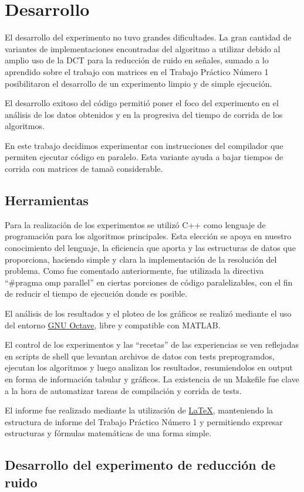 
\section{Desarrollo}

El desarrollo del experimento no tuvo grandes dificultades. La gran cantidad de
variantes de implementaciones encontradas del algoritmo a utilizar debido al
amplio uso de la DCT para la reducci\'on de ruido en se\~nales, sumado a lo
aprendido sobre el trabajo con matrices en el Trabajo Pr\'actico N\'umero 1
posibilitaron el desarrollo de un experimento limpio y de simple ejecuci\'on.

El desarrollo exitoso del c\'odigo permiti\'o poner el foco del experimento en
el an\'alisis de los datos obtenidos y en la progresiva del tiempo de corrida
de los algoritmos.

En este trabajo decidimos experimentar con instrucciones del compilador que
permiten ejecutar c\'odigo en paralelo. Esta variante ayuda a bajar tiempos de
corrida con matrices de tama\~o considerable.

\subsection{Herramientas}

Para la realizaci\'on de los experimentos se utiliz\'o C++ como lenguaje de
programaci\'on para los algoritmos principales. Esta elecci\'on se apoya en
nuestro conocimiento del lenguaje, la eficiencia que aporta y las estructuras de
datos que proporciona, haciendo simple y clara la implementaci\'on de la
resoluci\'on del problema. Como fue comentado anteriormente, fue utilizada la
directiva ``\#pragma omp parallel'' en ciertas porciones de c\'odigo
paralelizables, con el fin de reducir el tiempo de ejecuci\'on donde es posible.

El an\'alisis de los resultados y el ploteo de los gr\'aficos se realiz\'o
mediante el uso del entorno \href{http://www.gnu.org/software/octave/}{GNU
Octave}, libre y compatible con MATLAB.

El control de los experimentos y las ``recetas'' de las experiencias se ven
reflejadas en scripts de shell que levantan archivos de datos con tests
preprogramdos, ejecutan los algoritmos y luego analizan los resultados,
resumiendolos en output en forma de informaci\'on tabular y gr\'aficos.
La existencia de un Makefile fue clave a la hora de automatizar tareas de
compilaci\'on y corrida de tests.

El informe fue realizado mediante la utilizaci\'on de \href{http://www.latex-project.org/}{LaTeX},
 manteniendo la estructura de informe del Trabajo Pr\'actico N\'umero 1 y
permitiendo expresar estructuras y f\'ormulas matem\'aticas de una forma simple.

\subsection{Desarrollo del experimento de reducci\'on de ruido}
